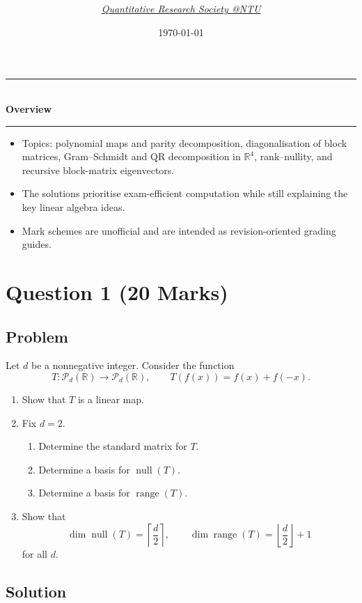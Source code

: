 \documentclass[12pt]{article}
\title{
\Huge \CourseCode\ \CourseName \\[0.3em]
\Large \DocType  \\[0.3em]
\large \ExamMeta
}
\author{
  \textit{\href{https://qrsntu.org}{Quantitative Research Society @NTU}}
}
\date{\today}
\newcommand{\R}{\mathbb{R}}
\newcommand{\Ppoly}{\mathcal{P}}
\newcommand{\Null}{\operatorname{null}}
\newcommand{\Range}{\operatorname{range}}
\newenvironment{overview}{
  \par\bigskip
  \begin{center}
    \rule{0.92\linewidth}{0.6pt}\\[-0.2em]
    \textbf{Overview}\\[-0.2em]
    \rule{0.92\linewidth}{0.6pt}
  \end{center}
  \vspace{-0.3em}
  \begin{itemize}[leftmargin=1.6em, itemsep=0.2em, topsep=0.2em]
}{
  \end{itemize}
  \par\bigskip
}
\begin{document}
\maketitle
\thispagestyle{plainfirst}
\pagestyle{main}


\begin{overview}
  \item Topics: polynomial maps and parity decomposition, diagonalisation of block matrices, Gram--Schmidt and QR decomposition in $\R^4$, rank--nullity, and recursive block-matrix eigenvectors.
  \item The solutions prioritise exam-efficient computation while still explaining the key linear algebra ideas.
  \item Mark schemes are unofficial and are intended as revision-oriented grading guides.
\end{overview}


\newpage
\tableofcontents
\newpage

\section{Question 1 \hfill (20 Marks)}

\subsection{Problem}
Let $d$ be a nonnegative integer. Consider the function
\[
T:\Ppoly_d(\R)\to\Ppoly_d(\R),
\qquad
T(f(x))=f(x)+f(-x).
\]
\begin{enumerate}[label=(\alph*)]
  \item Show that $T$ is a linear map.
  \item Fix $d=2$.
  \begin{enumerate}[label=(\roman*)]
    \item Determine the standard matrix for $T$.
    \item Determine a basis for $\Null(T)$.
    \item Determine a basis for $\Range(T)$.
  \end{enumerate}
  \item Show that
  \[
  \dim\Null(T)=\left\lceil\frac d2\right\rceil,
  \qquad
  \dim\Range(T)=\left\lfloor\frac d2\right\rfloor+1
  \]
  for all $d$.
\end{enumerate}

\subsection{Solution}
\end{document}
